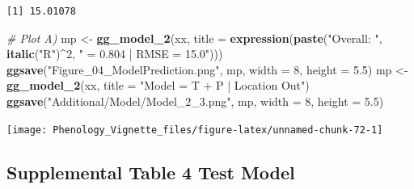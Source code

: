 \documentclass[
]{article}
\newenvironment{Shaded}{\begin{snugshade}}{\end{snugshade}}
\newcommand{\CommentTok}[1]{\textcolor[rgb]{0.56,0.35,0.01}{\textit{#1}}}
\newcommand{\DataTypeTok}[1]{\textcolor[rgb]{0.13,0.29,0.53}{#1}}
\newcommand{\DecValTok}[1]{\textcolor[rgb]{0.00,0.00,0.81}{#1}}
\newcommand{\FloatTok}[1]{\textcolor[rgb]{0.00,0.00,0.81}{#1}}
\newcommand{\KeywordTok}[1]{\textcolor[rgb]{0.13,0.29,0.53}{\textbf{#1}}}
\newcommand{\NormalTok}[1]{#1}
\newcommand{\OperatorTok}[1]{\textcolor[rgb]{0.81,0.36,0.00}{\textbf{#1}}}
\newcommand{\StringTok}[1]{\textcolor[rgb]{0.31,0.60,0.02}{#1}}
\begin{document}
\begin{Shaded}
\end{Shaded}

\begin{verbatim}
[1] 15.01078
\end{verbatim}

\begin{Shaded}
\begin{Highlighting}[]
\CommentTok{# Plot A)}
\NormalTok{mp <-}\StringTok{ }\KeywordTok{gg_model_2}\NormalTok{(xx, }\DataTypeTok{title =} \KeywordTok{expression}\NormalTok{(}\KeywordTok{paste}\NormalTok{(}\StringTok{"Overall: "}\NormalTok{,}
        \KeywordTok{italic}\NormalTok{(}\StringTok{"R"}\NormalTok{)}\OperatorTok{^}\DecValTok{2}\NormalTok{, }\StringTok{" = 0.804 | RMSE = 15.0"}\NormalTok{)))}
\KeywordTok{ggsave}\NormalTok{(}\StringTok{"Figure_04_ModelPrediction.png"}\NormalTok{, mp, }\DataTypeTok{width =} \DecValTok{8}\NormalTok{, }\DataTypeTok{height =} \FloatTok{5.5}\NormalTok{)}
\NormalTok{mp <-}\StringTok{ }\KeywordTok{gg_model_2}\NormalTok{(xx, }\DataTypeTok{title =} \StringTok{"Model = T + P | Location Out"}\NormalTok{)}
\KeywordTok{ggsave}\NormalTok{(}\StringTok{"Additional/Model/Model_2_3.png"}\NormalTok{, mp, }\DataTypeTok{width =} \DecValTok{8}\NormalTok{, }\DataTypeTok{height =} \FloatTok{5.5}\NormalTok{)}
\end{Highlighting}
\end{Shaded}

\texttt{[image: Phenology\_Vignette\_files/figure-latex/unnamed-chunk-72-1]}

\hypertarget{supplemental-table-4-test-model}{%
\subsection{Supplemental Table 4 Test
Model}\label{supplemental-table-4-test-model}}
\end{document}
